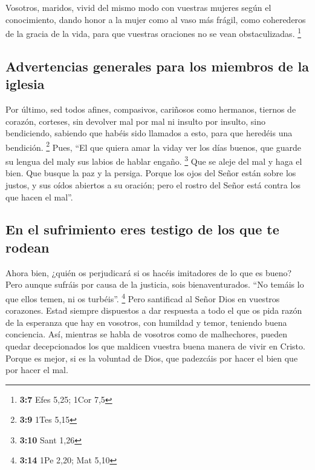 Vosotros, maridos, vivid del mismo modo con vuestras
mujeres según el conocimiento, dando honor a la mujer como al vaso más
frágil, como coherederos de la gracia de la vida, para que vuestras
oraciones no se vean obstaculizadas. \footnote{\textbf{3:7} Efes 5,25;
  1Cor 7,5}

\hypertarget{advertencias-generales-para-los-miembros-de-la-iglesia}{%
\subsection{Advertencias generales para los miembros de la
iglesia}\label{advertencias-generales-para-los-miembros-de-la-iglesia}}

 Por último, sed todos afines, compasivos, cariñosos como
hermanos, tiernos de corazón, corteses,  sin devolver mal
por mal ni insulto por insulto, sino bendiciendo, sabiendo que habéis
sido llamados a esto, para que heredéis una bendición. \footnote{\textbf{3:9}
  1Tes 5,15}  Pues, ``El que quiera amar la viday ver los
días buenos, que guarde su lengua del maly sus labios de hablar engaño.
\footnote{\textbf{3:10} Sant 1,26}  Que se aleje del mal
y haga el bien. Que busque la paz y la persiga.  Porque
los ojos del Señor están sobre los justos, y sus oídos abiertos a su
oración; pero el rostro del Señor está contra los que hacen el mal''.

\hypertarget{en-el-sufrimiento-eres-testigo-de-los-que-te-rodean}{%
\subsection{En el sufrimiento eres testigo de los que te
rodean}\label{en-el-sufrimiento-eres-testigo-de-los-que-te-rodean}}

 Ahora bien, ¿quién os perjudicará si os hacéis
imitadores de lo que es bueno?  Pero aunque sufráis por
causa de la justicia, sois bienaventurados. ``No temáis lo que ellos
temen, ni os turbéis''. \footnote{\textbf{3:14} 1Pe 2,20; Mat 5,10}
 Pero santificad al Señor Dios en vuestros corazones.
Estad siempre dispuestos a dar respuesta a todo el que os pida razón de
la esperanza que hay en vosotros, con humildad y temor, 
teniendo buena conciencia. Así, mientras se habla de vosotros como de
malhechores, pueden quedar decepcionados los que maldicen vuestra buena
manera de vivir en Cristo.  Porque es mejor, si es la
voluntad de Dios, que padezcáis por hacer el bien que por hacer el mal.

